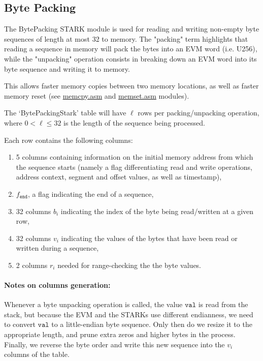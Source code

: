 \subsection{Byte Packing}
\label{byte-packing}

The BytePacking STARK module is used for reading and writing non-empty byte sequences of length at most 32 to memory.
The "packing" term highlights that reading a sequence in memory will pack the bytes into an EVM word (i.e. U256), while
the "unpacking" operation consists in breaking down an EVM word into its byte sequence and writing it to memory.

This allows faster memory copies between two memory locations, as well as faster memory reset
(see \href{https://github.com/0xPolygonZero/plonky2/blob/main/evm/src/cpu/kernel/asm/memory/memcpy.asm}{memcpy.asm} and 
\href{https://github.com/0xPolygonZero/plonky2/blob/main/evm/src/cpu/kernel/asm/memory/memset.asm}{memset.asm} modules).

The `BytePackingStark' table will have $\ell$ rows per packing/unpacking operation, where $0 < \ell \leq 32$ is the length of the sequence being processed.

Each row contains the following columns:
\begin{enumerate}
    \item 5 columns containing information on the initial memory address from which the sequence starts
    (namely a flag differentiating read and write operations, address context, segment and offset values, as well as timestamp),
    \item $f_{\texttt{end}}$, a flag indicating the end of a sequence,
    \item 32 columns $b_i$ indicating the index of the byte being read/written at a given row,
    \item 32 columns $v_i$ indicating the values of the bytes that have been read or written during a sequence,
    \item 2 columns $r_i$ needed for range-checking the the byte values.
\end{enumerate}

\paragraph{Notes on columns generation:}
Whenever a byte unpacking operation is called, the value $\texttt{val}$ is read from the stack, but because the EVM and the STARKs use different endianness, we need to convert $\texttt{val}$ to a little-endian byte sequence. Only then do we resize it to the appropriate length, and prune extra zeros and higher bytes in the process. Finally, we reverse the byte order and write this new sequence into the $v_i$ columns of the table. 

